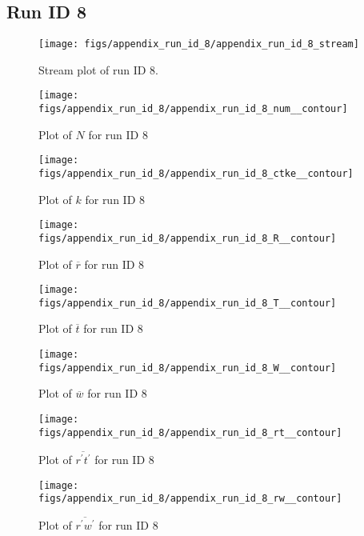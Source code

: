 \subsection{Run ID 8}
\begin{figure}[H]
\centering
\texttt{[image: figs/appendix\_run\_id\_8/appendix\_run\_id\_8\_stream]}
\caption{Stream plot of run ID 8.}
\label{fig:appendix_run_id_8_stream}
\end{figure}


\begin{figure}[H]
\centering
\texttt{[image: figs/appendix\_run\_id\_8/appendix\_run\_id\_8\_num\_\_contour]}
\caption{Plot of $N$ for run ID 8}
\label{fig:appendix_run_id_8_num__contour}
\end{figure}


\begin{figure}[H]
\centering
\texttt{[image: figs/appendix\_run\_id\_8/appendix\_run\_id\_8\_ctke\_\_contour]}
\caption{Plot of $k$ for run ID 8}
\label{fig:appendix_run_id_8_ctke__contour}
\end{figure}


\begin{figure}[H]
\centering
\texttt{[image: figs/appendix\_run\_id\_8/appendix\_run\_id\_8\_R\_\_contour]}
\caption{Plot of $\overline{r}$ for run ID 8}
\label{fig:appendix_run_id_8_R__contour}
\end{figure}


\begin{figure}[H]
\centering
\texttt{[image: figs/appendix\_run\_id\_8/appendix\_run\_id\_8\_T\_\_contour]}
\caption{Plot of $\overline{t}$ for run ID 8}
\label{fig:appendix_run_id_8_T__contour}
\end{figure}


\begin{figure}[H]
\centering
\texttt{[image: figs/appendix\_run\_id\_8/appendix\_run\_id\_8\_W\_\_contour]}
\caption{Plot of $\overline{w}$ for run ID 8}
\label{fig:appendix_run_id_8_W__contour}
\end{figure}


\begin{figure}[H]
\centering
\texttt{[image: figs/appendix\_run\_id\_8/appendix\_run\_id\_8\_rt\_\_contour]}
\caption{Plot of $\overline{r^\prime t^\prime}$ for run ID 8}
\label{fig:appendix_run_id_8_rt__contour}
\end{figure}


\begin{figure}[H]
\centering
\texttt{[image: figs/appendix\_run\_id\_8/appendix\_run\_id\_8\_rw\_\_contour]}
\caption{Plot of $\overline{r^\prime w^\prime}$ for run ID 8}
\label{fig:appendix_run_id_8_rw__contour}
\end{figure}


